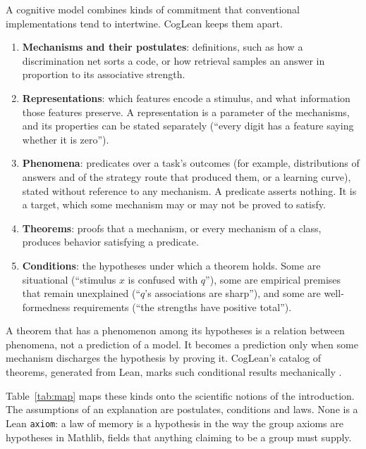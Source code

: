 \documentclass[11pt]{article}
\newcommand{\code}[1]{\texttt{#1}}
\begin{document}
A cognitive model combines kinds of commitment that conventional implementations tend to intertwine. CogLean keeps them apart.
\begin{enumerate}
  \item \textbf{Mechanisms and their postulates}: definitions, such as how a discrimination net sorts a code, or how retrieval samples an answer in proportion to its associative strength.
  \item \textbf{Representations}: which features encode a stimulus, and what information those features preserve. A representation is a parameter of the mechanisms, and its properties can be stated separately (``every digit has a feature saying whether it is zero'').
  \item \textbf{Phenomena}: predicates over a task's outcomes (for example, distributions of answers and of the strategy route that produced them, or a learning curve), stated without reference to any mechanism. A predicate asserts nothing. It is a target, which some mechanism may or may not be proved to satisfy.
  \item \textbf{Theorems}: proofs that a mechanism, or every mechanism of a class, produces behavior satisfying a predicate.
  \item \textbf{Conditions}: the hypotheses under which a theorem holds. Some are situational (``stimulus $x$ is confused with $q$''), some are empirical premises that remain unexplained (``$q$'s associations are sharp''), and some are well-formedness requirements (``the strengths have positive total'').
\end{enumerate}
A theorem that has a phenomenon among its hypotheses is a relation between phenomena, not a prediction of a model. It becomes a prediction only when some mechanism discharges the hypothesis by proving it. CogLean's catalog of theorems, generated from Lean, marks such conditional results mechanically \citep{coglean}.

Table~\ref{tab:map} maps these kinds onto the scientific notions of the introduction. The assumptions of an explanation are postulates, conditions and laws. None is a Lean \code{axiom}: a law of memory is a hypothesis in the way the group axioms are hypotheses in Mathlib, fields that anything claiming to be a group must supply.
\end{document}
